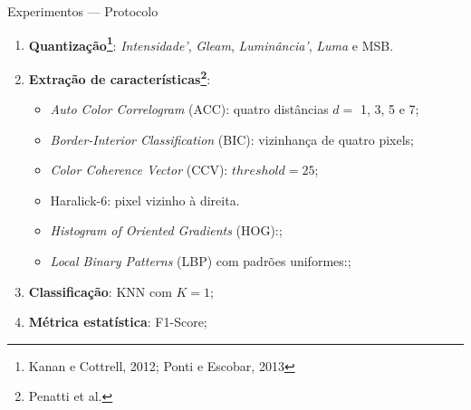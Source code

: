 \documentclass[10pt]{beamer}
\begin{document}
\begin{frame}{Experimentos --- Protocolo}
  \setlength\leftmargini{1em}
  \begin{block}{}
        \begin{enumerate}
      \item \textbf{Quantização\footnote{Kanan e Cottrell, 2012; Ponti e Escobar, 2013}}: \emph{Intensidade'}, \emph{Gleam}, \emph{Luminância'}, \emph{Luma} e MSB.
      \item \textbf{Extração de características\footnote{Penatti et al.}}:
      \begin{itemize}
        \item \textit{Auto Color Correlogram} (ACC): quatro distâncias $d =$ 1, 3, 5 e 7;
        \item \textit{Border-Interior Classification} (BIC): vizinhança de quatro pixels;
        \item \textit{Color Coherence Vector} (CCV): $\mathit{threshold} = 25$;
        \item Haralick-6: pixel vizinho à direita.
        \item \textit{Histogram of Oriented Gradients} (HOG):;
        \item \textit{Local Binary Patterns} (LBP) com padrões uniformes:;
      \end{itemize}
      \item \textbf{Classificação}: KNN com $K=1$;
      \item \textbf{Métrica estatística}: F1-Score;
    \end{enumerate}
  \end{block}
\end{frame}
\end{document}
